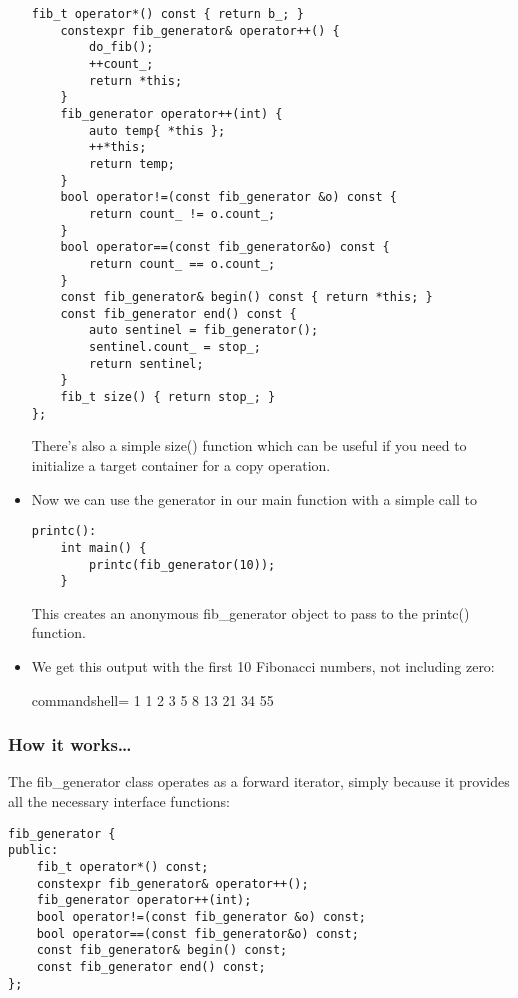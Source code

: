 \begin{itemize}
\begin{lstlisting}[style=styleCXX]
	fib_t operator*() const { return b_; }
	constexpr fib_generator& operator++() {
		do_fib();
		++count_;
		return *this;
	}
	fib_generator operator++(int) {
		auto temp{ *this };
		++*this;
		return temp;
	}
	bool operator!=(const fib_generator &o) const {
		return count_ != o.count_;
	}
	bool operator==(const fib_generator&o) const {
		return count_ == o.count_;
	}
	const fib_generator& begin() const { return *this; }
	const fib_generator end() const {
		auto sentinel = fib_generator();
		sentinel.count_ = stop_;
		return sentinel;
	}
	fib_t size() { return stop_; }
};
\end{lstlisting}

There's also a simple size() function which can be useful if you need to initialize a target container for a copy operation.

\item 
Now we can use the generator in our main function with a simple call to

\begin{lstlisting}[style=styleCXX]
printc():
	int main() {
		printc(fib_generator(10));
	}
\end{lstlisting}

This creates an anonymous fib\_generator object to pass to the printc() function.

\item 
We get this output with the first 10 Fibonacci numbers, not including zero:

\begin{tcblisting}{commandshell={}}
1 1 2 3 5 8 13 21 34 55
\end{tcblisting}
\end{itemize}

\subsubsection{How it works…}

The fib\_generator class operates as a forward iterator, simply because it provides all the necessary interface functions:

\begin{lstlisting}[style=styleCXX]
fib_generator {
public:
	fib_t operator*() const;
	constexpr fib_generator& operator++();
	fib_generator operator++(int);
	bool operator!=(const fib_generator &o) const;
	bool operator==(const fib_generator&o) const;
	const fib_generator& begin() const;
	const fib_generator end() const;
};
\end{lstlisting}

